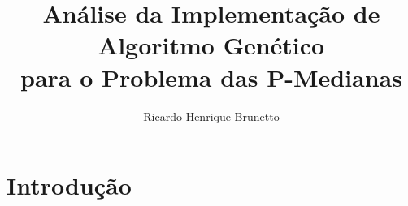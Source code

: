 

\sloppy

\title{Análise da Implementação de Algoritmo Genético\\para o Problema das P-Medianas}

\author{Ricardo Henrique Brunetto}


\address{Departamento de Informática -- Universidade Estadual de Maringá (UEM)\\
	Maringá -- PR -- Brasil
}



	\maketitle

	{\resumo{}}

  \section{Introdução}

	
	



